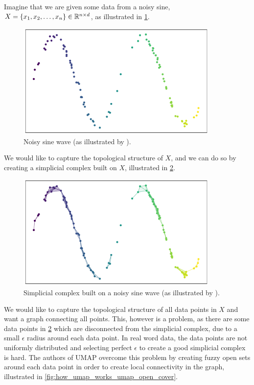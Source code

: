 Imagine that we are given some data from a noisy sine, $X = \left\{x_1, x_2, \ldots, x_n\right\} \in \mathbb{R}^{n \times d}$, as illustrated in \cref{fig:how_umap_works_raw_data}.
\begin{figure}[H]
    \centering
    \includegraphics[width=10cm]{thesis/figures/how_umap_works_raw_data.png}
    \caption{Noisy sine wave (as illustrated by \cite{how-umap-works-2018}).}
    \label{fig:how_umap_works_raw_data}
\end{figure}

We would like to capture the topological structure of $X$, and we can do so by creating a simplicial complex built on $X$, illustrated in \cref{fig:how_umap_works_basic_graph}.
\begin{figure}[H]
    \centering
    \includegraphics[width=10cm]{thesis/figures/how_umap_works_basic_graph.png}
    \caption{Simplicial complex built on a noisy sine wave (as illustrated by \cite{how-umap-works-2018}).}
    \label{fig:how_umap_works_basic_graph}
\end{figure}
We would like to capture the topological structure of all data points in $X$ and want a graph connecting all points. This, however is a problem, as there are some data points in \cref{fig:how_umap_works_basic_graph} which are disconnected from the simplicial complex, due to a small $\epsilon$ radius around each data point. In real word data, the data points are not uniformly distributed and selecting perfect $\epsilon$ to create a good simplicial complex is hard. The authors of UMAP overcome this problem by creating fuzzy open sets around each data point in order to create local connectivity in the graph, illustrated in \cref{fig:how_umap_works_umap_open_cover}.

